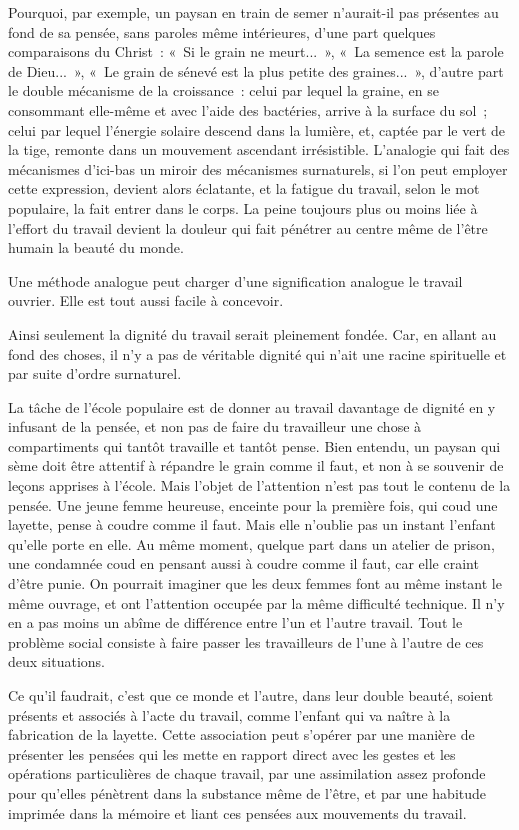 \documentclass[french,twoside]{book} %
\begin{document}
Pourquoi, par exemple, un paysan en train de semer n'aurait-il pas présentes au fond de sa pensée, sans paroles même intérieures, d'une part quelques comparaisons du Christ : « Si le grain ne meurt... », « La semence est la parole de Dieu... », « Le grain de sénevé est la plus petite des graines... », d'autre part le double mécanisme de la croissance : celui par lequel la graine, en se consommant elle-même et avec l'aide des bactéries, arrive à la surface du sol ; celui par lequel l'énergie solaire descend dans la lumière, et, captée par le vert de la tige, remonte dans un mouvement ascendant irrésistible. L'analogie qui fait des mécanismes d'ici-bas un miroir des mécanismes surnaturels, si l'on peut employer cette expression, devient alors éclatante, et la fatigue du travail, selon le mot populaire, la fait entrer dans le corps. La peine toujours plus ou moins liée à l'effort du travail devient la douleur qui fait pénétrer au centre même de l'être humain la beauté du monde.\par
Une méthode analogue peut charger d'une signification analogue le travail ouvrier. Elle est tout aussi facile à concevoir.\par
Ainsi seulement la dignité du travail serait pleinement fondée. Car, en allant au fond des choses, il n'y a pas de véritable dignité qui n'ait une racine spirituelle et par suite d'ordre surnaturel.\par
La tâche de l'école populaire est de donner au travail davantage de dignité en y infusant de la pensée, et non pas de faire du travailleur une chose à compartiments qui tantôt travaille et tantôt pense. Bien entendu, un paysan qui sème doit être attentif à répandre le grain comme il faut, et non à se souvenir de leçons apprises à l'école. Mais l'objet de l'attention n'est pas tout le contenu de la pensée. Une jeune femme heureuse, enceinte pour la première fois, qui coud une layette, pense à coudre comme il faut. Mais elle n'oublie pas un instant l'enfant qu'elle porte en elle. Au même moment, quelque part dans un atelier de prison, une condamnée coud en pensant aussi à coudre comme il faut, car elle craint d'être punie. On pourrait imaginer que les deux femmes font au même instant le même ouvrage, et ont l'attention occupée par la même difficulté technique. Il n'y en a pas moins un abîme de différence entre l'un et l'autre travail. Tout le problème social consiste à faire passer les travailleurs de l'une à l'autre de ces deux situations.\par
Ce qu'il faudrait, c'est que ce monde et l'autre, dans leur double beauté, soient présents et associés à l'acte du travail, comme l'enfant qui va naître à la fabrication de la layette. Cette association peut s'opérer par une manière de présenter les pensées qui les mette en rapport direct avec les gestes et les opérations particulières de chaque travail, par une assimilation assez profonde pour qu'elles pénètrent dans la substance même de l'être, et par une habitude imprimée dans la mémoire et liant ces pensées aux mouvements du travail.\par
\end{document}
